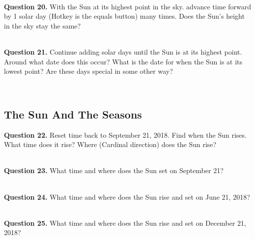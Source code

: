\documentclass[11pt]{article}
\begin{document}
\hrulefill\\

\textbf{Question 20.} With the Sun at its highest point in the sky. advance time forward by 1 solar day (Hotkey is the equals button) many times. Does the Sun's height in the sky stay the same?\\
\vspace*{1.5cm}

\hrulefill\\

\textbf{Question 21.} Continue adding solar days until the Sun is at its highest point. Around what date does this occur? What is the date for when the Sun is at its lowest point? Are these days special in some other way?\\
\vspace*{1.5cm}

\hrulefill\\

\newpage

\subsection{The Sun And The Seasons}

\textbf{Question 22.} Reset time back to September 21, 2018. Find when the Sun rises. What time does it rise? Where (Cardinal direction) does the Sun rise?\\
\vspace*{1.5cm}

\hrulefill\\

\textbf{Question 23.} What time and where does the Sun set on September 21?\\
\vspace*{1.5cm}

\hrulefill\\

\textbf{Question 24.} What time and where does the Sun rise and set on June 21, 2018?\\
\vspace*{1.5cm}

\hrulefill\\

\textbf{Question 25.} What time and where does the Sun rise and set on December 21, 2018?\\
\vspace*{1.5cm}

\hrulefill\\
\end{document}
